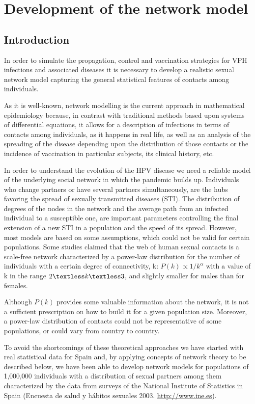 
\chapter{Development of the network model}\label{paper1}

\section{Introduction}
In order to simulate the propagation, control and vaccination strategies for VPH infections and associated diseases it is necessary to develop a realistic sexual network model capturing the general statistical features of contacts among individuals.

As it is well-known, network modelling is the current approach in mathematical epidemiology because, in contrast with traditional methods based upon systems of differential equations, it allows for a description of infections in terms of contacts among individuals, as it happens in real life, as well as an analysis of the spreading of the disease depending upon the distribution of those contacts or the incidence of vaccination in particular subjects, its clinical history, etc.

In order to understand the evolution of the HPV disease we need a reliable model of the underlying social network in which the pandemic builds up. Individuals who change partners or have several partners simultaneously, are the hubs favoring the spread of sexually transmitted diseases (STI). The distribution of degrees of the nodes in the network and the average path from an infected individual to a susceptible one, are important parameters controlling the final extension of a new STI in a population and the speed of its spread. However, most models are based on some assumptions, which could not be valid for certain populations. Some studies claimed that the web of human sexual contacts is a scale-free network characterized by a power-law distribution for the number of individuals with a certain degree of connectivity, k: $P(k)\propto1/k^\alpha$  with a value of k in the range $2 \textless k \textless 3$, and slightly smaller for males than for females.

Although $P(k)$ provides some valuable information about the network, it is not a sufficient prescription on how to build it for a given population size.
Moreover, a power-law distribution of contacts could not be representative of some populations, or could vary from country to country.

To avoid the shortcomings of these theoretical approaches we have started with real statistical data for Spain and, by applying concepts of network theory to be described below, we have been able to develop network models for populations of 1,000,000 individuals with a distribution of sexual partners among them characterized by the data from surveys of the National Institute of Statistics in Spain (Encuesta de salud y h\'abitos sexuales 2003. \url{http://www.ine.es}).

